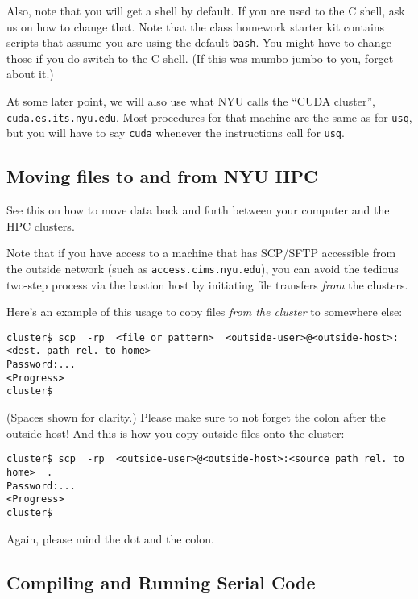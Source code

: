 \documentclass[11pt]{article}
\begin{document}
\begin{enumerate}
Also, note that you will get a
 shell
by default. If you are used to the C shell, ask us on how to change
that. Note that the class homework starter kit contains scripts that
assume you are using the default \texttt{bash}. You might have to
change those if you do switch to the C shell.  (If this was
mumbo-jumbo to you, forget about it.)

At some later point, we will also use what NYU calls the ``CUDA
cluster'', \texttt{cuda.es.its.nyu.edu}. Most procedures for that
machine are the same as for \texttt{usq}, but you will have to
say \texttt{cuda} whenever the instructions call for \texttt{usq}.

\subsection*{Moving files to and from NYU HPC}

See this
 on how to move data back and forth between your computer and the
HPC clusters.

Note that if you have access to a machine that has SCP/SFTP accessible
from the outside network (such as \texttt{access.cims.nyu.edu}), you
can avoid the tedious two-step process via the bastion host by
initiating file transfers \emph{from} the clusters.

Here's an example of this usage to copy files \emph{from the cluster}
to somewhere else:
\begin{lstlisting}
cluster$ scp  -rp  <file or pattern>  <outside-user>@<outside-host>:<dest. path rel. to home>
Password:...
<Progress>
cluster$
\end{lstlisting}
(Spaces shown for clarity.) Please make sure to not forget the colon
after the outside host!  And this is how you copy outside files onto
the cluster:
\begin{lstlisting}
cluster$ scp  -rp  <outside-user>@<outside-host>:<source path rel. to home>  .
Password:...
<Progress>
cluster$
\end{lstlisting}
Again, please mind the dot and the colon.

\subsection*{Compiling and Running Serial Code}


\end{enumerate}
\end{document}
